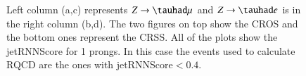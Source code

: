 \begin{figure}[htbp]
	\centering
	\hfill
	\caption{Left column (a,c) represents $Z\to\tauhad\mu$ and $Z\to\tauhad e$ is in the right column (b,d). The two figures on top show the CROS and the bottom ones represent the CRSS. All of the plots show the jetRNNScore for 1 prongs. In this case the events used to calculate RQCD are the ones with jetRNNScore$<0.4$.  }
	\label{Fig14}
\end{figure}

